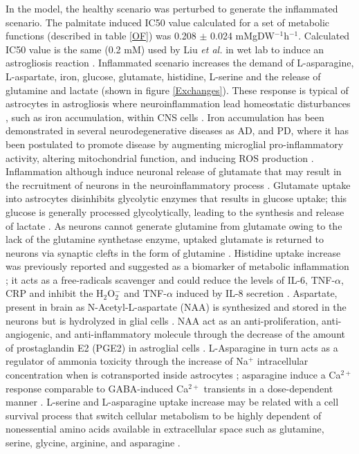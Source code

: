 In the model, the healthy scenario was perturbed to generate the inflammated scenario. The palmitate induced IC50 value calculated for a set of metabolic functions (described in table \ref{OF}) was 0.208 $\pm$ 0.024 mMgDW$^{-1}$h$^{-1}$. Calculated IC50 value is the same (0.2 mM) used by Liu \emph{et al.} in wet lab to induce an astrogliosis reaction \cite{Liu2013}. Inflammated scenario increases the demand of L-asparagine, L-aspartate, iron, glucose, glutamate, histidine, L-serine and the release of glutamine and lactate (shown in figure \ref{Exchanges}). These response is typical of astrocytes in astrogliosis where neuroinflammation lead homeostatic disturbances \cite{Rangel-Aldao2015}, such as iron accumulation, within CNS cells \cite{Jha2016}. Iron accumulation has been demonstrated in several neurodegenerative diseases as AD, and PD, where it has been postulated to promote disease by augmenting microglial pro-inflammatory activity, altering mitochondrial function, and inducing ROS production \cite{Williams2012}.
Inflammation although induce neuronal release of glutamate that may result in the recruitment of neurons in the neuroinflammatory process \cite{Parpura2000}. Glutamate uptake into astrocytes disinhibits glycolytic enzymes that results in glucose uptake;  this glucose is generally processed glycolytically, leading to the synthesis and release of lactate \cite{Jha2016}. As neurons cannot generate glutamine from glutamate owing to the lack of the glutamine synthetase enzyme, uptaked glutamate is returned to neurons via synaptic clefts in the form of glutamine \cite{Hertz1999}.
Histidine uptake increase was previously reported and suggested as a biomarker of metabolic inflammation \cite{Niu2012}; it acts as a free-radicals scavenger and could reduce the levels of IL-6, TNF-$\alpha$, CRP and inhibit the H$_2$O$_2^-$ and TNF-$\alpha$ induced by IL-8 secretion \cite{Lee2005,Son2005}. Aspartate, present in brain as N-Acetyl-L-aspartate (NAA) is synthesized and stored in the neurons but is hydrolyzed in glial cells \cite{Baslow2003}. NAA act as an anti-proliferation, anti-angiogenic, and anti-inflammatory molecule through the decrease of the amount of prostaglandin E2 (PGE2) in astroglial cells \cite{Rael2004}. L-Asparagine in turn acts as a regulator of ammonia toxicity through the increase of Na$^+$ intracellular concentration when is cotransported inside astrocytes \cite{Chaudhry1999}; asparagine induce a Ca$^{2+}$ response comparable to GABA-induced Ca$^{2+}$ transients in a dose-dependent manner \cite{Doengi2009}. L-serine and L-asparagine uptake increase may be related with a cell survival process that switch cellular metabolism to be highly dependent of nonessential amino acids available in extracellular space such as glutamine, serine, glycine, arginine, and asparagine \cite{Green2014}.
